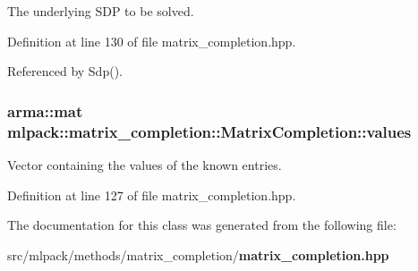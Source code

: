 The underlying S\+DP to be solved. 



Definition at line 130 of file matrix\+\_\+completion.\+hpp.



Referenced by Sdp().

\subsubsection[{values}]{\setlength{\rightskip}{0pt plus 5cm}arma\+::mat mlpack\+::matrix\+\_\+completion\+::\+Matrix\+Completion\+::values\hspace{0.3cm}{\ttfamily [private]}}\label{classmlpack_1_1matrix__completion_1_1MatrixCompletion_a460786684fa309192016bdfef5d4b1c9}


Vector containing the values of the known entries. 



Definition at line 127 of file matrix\+\_\+completion.\+hpp.



The documentation for this class was generated from the following file\+:\begin{DoxyCompactItemize}
\item 
src/mlpack/methods/matrix\+\_\+completion/{\bf matrix\+\_\+completion.\+hpp}\end{DoxyCompactItemize}
